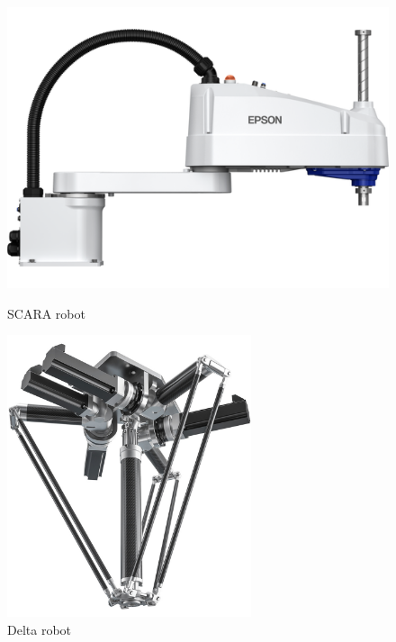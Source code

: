 \begin{figure}[H]	
	\centering
	\begin{minipage}{0.5\textwidth}
		\centering
		\includegraphics[width=1\textwidth]{figures/scara.png}
		\caption{SCARA robot \cite{Scara}}
		\label{Scara}
	\end{minipage}\hfill
	\begin{minipage}{0.5\textwidth}
		\centering
		\includegraphics[width=0.639\textwidth]{figures/delta.png}
		\caption{Delta robot \cite{Delta}}
		\label{Delta}
	\end{minipage}\par
\end{figure}



